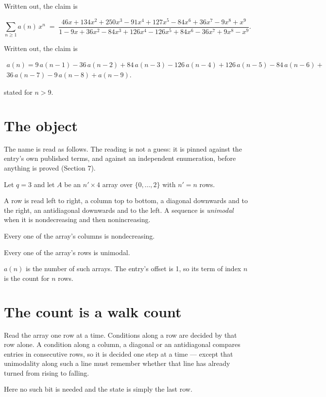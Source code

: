 \documentclass[11pt]{article}
\theoremstyle{definition}
\begin{document}
Written out, the claim is

\[\sum_{n \ge 1} a(n)\,x^n \;=\; \frac{46x + 134x^{2} + 250x^{3} - 91x^{4} + 127x^{5} - 84x^{6} + 36x^{7} - 9x^{8} + x^{9}}{1 - 9x + 36x^{2} - 84x^{3} + 126x^{4} - 126x^{5} + 84x^{6} - 36x^{7} + 9x^{8} - x^{9}}.\]

Written out, the claim is

\begin{multline*} a(n) = 9\,a(n-1) - 36\,a(n-2) + 84\,a(n-3) - 126\,a(n-4) + 126\,a(n-5) - 84\,a(n-6) + \\ 36\,a(n-7) - 9\,a(n-8) + a(n-9). \end{multline*}

stated for $n > 9$.

\section{The object}

The name is read as follows. The reading is not a guess: it is pinned against the entry's own published terms, and against an independent enumeration, before anything is proved (Section 7).

Let $q = 3$ and let $A$ be an $n' \times 4$ array over $\{0,\dots,2\}$ with $n' = n$ rows.

A row is read left to right, a column top to bottom, a diagonal downwards and to the right, an antidiagonal downwards and to the left. A sequence is {\itshape unimodal} when it is nondecreasing and then nonincreasing.

Every one of the array's columns is nondecreasing.

Every one of the array's rows is unimodal.

$a(n)$ is the number of such arrays. The entry's offset is 1, so its term of index $n$ is the count for $n$ rows.

\section{The count is a walk count}

Read the array one row at a time. Conditions along a row are decided by that row alone. A condition along a column, a diagonal or an antidiagonal compares entries in consecutive rows, so it is decided one step at a time --- except that unimodality along such a line must remember whether that line has already turned from rising to falling.

Here no such bit is needed and the state is simply the last row.
\end{document}
